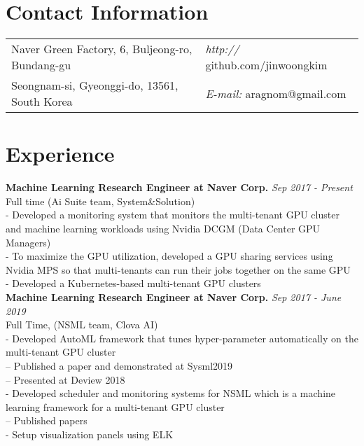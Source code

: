\documentclass[margin,line]{res}
\begin{document}

\begin{resume}

\section{\sc Contact Information}
\vspace{.05in}

\begin{tabular}{@{}p{3.5in}p{3in}}
Naver Green Factory, 6, Buljeong-ro, Bundang-gu & {\it http://} github.com/jinwoongkim \\
Seongnam-si, Gyeonggi-do, 13561, South Korea & {\it E-mail:}  aragnom@gmail.com \\
\end{tabular}

\section{\sc Experience}
{\bf Machine Learning Research Engineer at Naver Corp.} \hfill {\it Sep 2017 - Present} \\
Full time (Ai Suite team, System&Solution) \\
- Developed a monitoring system that monitors the multi-tenant GPU cluster and machine learning workloads using Nvidia DCGM (Data Center GPU Managers) \\
- To maximize the GPU utilization, developed a GPU sharing services using Nvidia MPS so that multi-tenants can run their jobs together on the same GPU\\
- Developed a Kubernetes-based multi-tenant GPU clusters\\

{\bf Machine Learning Research Engineer at Naver Corp.} \hfill {\it Sep 2017 - June 2019} \\
Full Time, (NSML team, Clova AI)  \\
- Developed AutoML framework that tunes hyper-parameter automatically on the multi-tenant GPU cluster \\
-- Published a paper and demonstrated at Sysml2019 \\
-- Presented at Deview 2018 \\
- Developed scheduler and monitoring systems for NSML which is a machine learning framework for a multi-tenant GPU cluster \\
-- Published papers \\
- Setup visualization panels using ELK \\


\end{resume}
\end{document}
